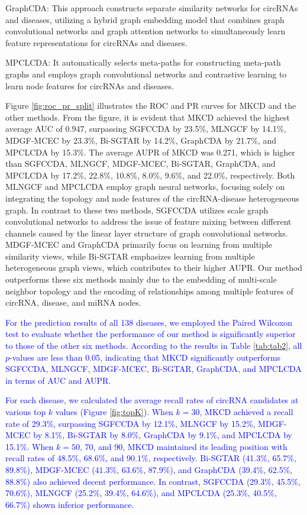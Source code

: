 \documentclass{bioinfo}
\begin{document}
\begin{methods}
GraphCDA: This approach constructs separate similarity networks for circRNAs and diseases, utilizing a hybrid graph embedding model that combines graph convolutional networks and graph attention networks to simultaneously learn feature representations for circRNAs and diseases.

MPCLCDA: It automatically selects meta-paths for constructing meta-path graphs and employs graph convolutional networks and contrastive learning to learn node features for circRNAs and diseases.

Figure \ref{fig:roc_pr_split} illustrates the ROC and PR curves for MKCD and the other methods. From the figure, it is evident that MKCD achieved the highest average AUC of 0.947, surpassing SGFCCDA by 23.5\%, MLNGCF by 14.1\%, MDGF-MCEC by 23.3\%, Bi-SGTAR by 14.2\%, GraphCDA by 21.7\%, and MPCLCDA by 15.3\%. The average AUPR of MKCD was 0.271, which is higher than SGFCCDA, MLNGCF, MDGF-MCEC, Bi-SGTAR, GraphCDA, and MPCLCDA by 17.2\%, 22.8\%, 10.8\%, 8.0\%, 9.6\%, and 22.0\%, respectively. Both MLNGCF and MPCLCDA employ graph neural networks, focusing solely on integrating the topology and node features of the circRNA-disease heterogeneous graph. In contrast to these two methods, SGFCCDA utilizes scale graph convolutional networks to address the issue of feature mixing between different channels caused by the linear layer structure of graph convolutional networks. MDGF-MCEC and GraphCDA primarily focus on learning from multiple similarity views, while Bi-SGTAR emphasizes learning from multiple heterogeneous graph views, which contributes to their higher AUPR. Our method outperforms these six methods mainly due to the embedding of multi-scale neighbor topology and the encoding of relationships among multiple features of circRNA, disease, and miRNA nodes.

\textcolor{blue}{For the prediction results of all 138 diseases, we employed the Paired Wilcoxon test to evaluate whether the performance of our method is significantly superior to those of the other six methods. According to the results in Table \ref{tab:tab2}, all $p$-values are less than 0.05, indicating that MKCD significantly outperforms SGFCCDA, MLNGCF, MDGF-MCEC, Bi-SGTAR, GraphCDA, and MPCLCDA in terms of AUC and AUPR.}

\textcolor{blue}{For each disease, we calculated the average recall rates of circRNA candidates at various top $k$ values (Figure \ref{fig:topK}). When $k = 30$, MKCD achieved a recall rate of 29.3\%, surpassing SGFCCDA by 12.1\%, MLNGCF by 15.2\%, MDGF-MCEC by 8.1\%, Bi-SGTAR by 8.0\%, GraphCDA by 9.1\%, and MPCLCDA by 15.1\%. When $k = 50$, 70, and 90, MKCD maintained its leading position with recall rates of 48.5\%, 68.6\%, and 90.1\%, respectively. Bi-SGTAR (41.3\%, 65.7\%, 89.8\%), MDGF-MCEC (41.3\%, 63.6\%, 87.9\%), and GraphCDA (39.4\%, 62.5\%, 88.8\%) also achieved decent performance. In contrast, SGFCCDA (29.3\%, 45.5\%, 70.6\%), MLNGCF (25.2\%, 39.4\%, 64.6\%), and MPCLCDA (25.3\%, 40.5\%, 66.7\%) shown inferior performance.}


\end{methods}
\end{document}
